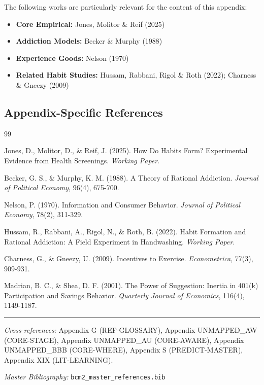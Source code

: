 The following works are particularly relevant for the content of this appendix:

\begin{itemize}[nosep]
    \item \textbf{Core Empirical:} Jones, Molitor \& Reif (2025)
    \item \textbf{Addiction Models:} Becker \& Murphy (1988)
    \item \textbf{Experience Goods:} Nelson (1970)
    \item \textbf{Related Habit Studies:} Hussam, Rabbani, Rigol \& Roth (2022); Charness \& Gneezy (2009)
\end{itemize}

\subsection{Appendix-Specific References}

\begin{thebibliography}{99}

 Jones, D., Molitor, D., \& Reif, J. (2025).
How Do Habits Form? Experimental Evidence from Health Screenings.
\textit{Working Paper}.

 Becker, G. S., \& Murphy, K. M. (1988).
A Theory of Rational Addiction. \textit{Journal of Political Economy}, 96(4), 675-700.

 Nelson, P. (1970).
Information and Consumer Behavior. \textit{Journal of Political Economy}, 78(2), 311-329.

 Hussam, R., Rabbani, A., Rigol, N., \& Roth, B. (2022).
Habit Formation and Rational Addiction: A Field Experiment in Handwashing.
\textit{Working Paper}.

 Charness, G., \& Gneezy, U. (2009).
Incentives to Exercise. \textit{Econometrica}, 77(3), 909-931.

 Madrian, B. C., \& Shea, D. F. (2001).
The Power of Suggestion: Inertia in 401(k) Participation and Savings Behavior.
\textit{Quarterly Journal of Economics}, 116(4), 1149-1187.

\end{thebibliography}



\vspace{1em}
\hrule
\vspace{0.5em}

\noindent\textit{Cross-references:}
Appendix G (REF-GLOSSARY),
Appendix UNMAPPED_AW (CORE-STAGE),
Appendix UNMAPPED_AU (CORE-AWARE),
Appendix UNMAPPED_BBB (CORE-WHERE),
Appendix S (PREDICT-MASTER),
Appendix XIX (LIT-LEARNING).

\noindent\textit{Master Bibliography:} \texttt{bcm2\_master\_references.bib}


